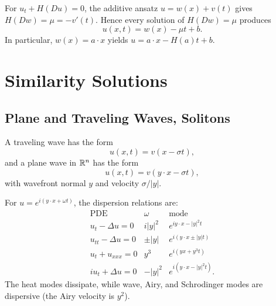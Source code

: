 \begin{example}
\label{ex:hamilton-jacobi-additive-separation}

For $u_t+H(Du)=0$, the additive ansatz $u=w(x)+v(t)$ gives
$H(Dw)=\mu=-v'(t)$. Hence every solution of $H(Dw)=\mu$ produces
\[
u(x,t)=w(x)-\mu t+b.
\]
In particular, $w(x)=a\cdot x$ yields $u=a\cdot x-H(a)t+b$.
\end{example}

\section{Similarity Solutions}
\label{sec:similarity-solutions}

\subsection{Plane and Traveling Waves, Solitons}
\label{sec:plane-traveling-waves-solitons}

\begin{definition}
\label{def:traveling-wave-plane-wave}
A traveling wave has the form
\[
u(x,t)=v(x-\sigma t),
\]
and a plane wave in $\mathbb{R}^n$ has the form
\[
u(x,t)=v(y\cdot x-\sigma t),
\]
with wavefront normal $y$ and velocity $\sigma/|y|$.
\end{definition}

\begin{example}
\label{ex:exponential-plane-wave-solutions}

For $u=e^{i(y\cdot x+\omega t)}$, the dispersion relations are:
\[
\begin{array}{c|c|c}
\text{PDE}&\omega&\text{mode}\\ \hline
u_t-\Delta u=0&i|y|^2&e^{iy\cdot x-|y|^2t}\\
u_{tt}-\Delta u=0&\pm|y|&e^{i(y\cdot x\pm|y|t)}\\
u_t+u_{xxx}=0&y^3&e^{i(yx+y^3t)}\\
iu_t+\Delta u=0&-|y|^2&e^{i(y\cdot x-|y|^2t)}.
\end{array}
\]
The heat modes dissipate, while wave, Airy, and Schrodinger modes are
dispersive (the Airy velocity is $y^2$).
\end{example}

